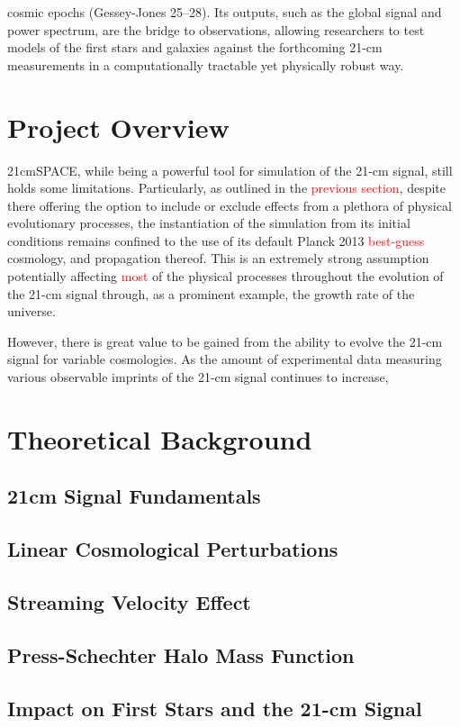 \documentclass[floats,floatfix,showpacs,amssymb,prd,superscriptaddress,nofootinbib]{revtex4-2} %
\newcommand{\red}{\textcolor{red}}
\begin{document}
cosmic epochs (Gessey-Jones 25–28). Its outputs, such as the global signal and power spectrum, are the bridge to observations, allowing researchers to test models of the first stars and galaxies against the forthcoming 21-cm measurements in a computationally tractable yet physically robust way.


\section{Project Overview}

21cmSPACE, while being a powerful tool for simulation of the 21-cm signal, still holds some limitations. Particularly, as outlined in the \red{previous section}, despite there offering the option to include or exclude effects from a plethora of physical evolutionary processes, the instantiation of the simulation from its initial conditions remains confined to the use of its default Planck 2013 \red{best-guess} cosmology, and propagation thereof. This is an extremely strong assumption potentially affecting \red{most} of the physical processes throughout the evolution of the 21-cm signal through, as a prominent example, the growth rate of the universe. 

However, there is great value to be gained from the ability to evolve the 21-cm signal for variable cosmologies. As the amount of experimental data measuring various observable imprints of the 21-cm signal continues to increase, 

\newpage
\section{Theoretical Background}
\subsection{21cm Signal Fundamentals}
\subsection{Linear Cosmological Perturbations}
\subsection{Streaming Velocity Effect}
\subsection{Press-Schechter Halo Mass Function}
\subsection{Impact on First Stars and the 21-cm Signal}
\end{document}
